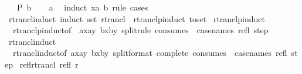 \begin{isabellebody}
\ \ \ {\isachardoublequoteopen}P\ b{\isachardoublequoteclose}\isanewline
%
\isadelimproof
\ \ %
\endisadelimproof
%
\isatagproof
{}\isamarkupfalse%
\ a\ \isamarkupfalse%
\ {\isacharparenleft}{\kern0pt}induct\ x{\isasymequiv}a\ b{\isacharparenright}{\kern0pt}\ {\isacharparenleft}{\kern0pt}rule\ cases{\isacharparenright}{\kern0pt}{\isacharplus}{\kern0pt}%
\endisatagproof
{\isafoldproof}%
%
\isadelimproof
\isanewline
%
\endisadelimproof
\isanewline
{}\isamarkupfalse%
\ rtrancl{\isacharunderscore}{\kern0pt}induct\ {\isacharbrackleft}{\kern0pt}induct\ set{\isacharcolon}{\kern0pt}\ rtrancl{\isacharbrackright}{\kern0pt}\ {\isacharequal}{\kern0pt}\ rtranclp{\isacharunderscore}{\kern0pt}induct\ {\isacharbrackleft}{\kern0pt}to{\isacharunderscore}{\kern0pt}set{\isacharbrackright}{\kern0pt}\isanewline
\isanewline
{}\isamarkupfalse%
\ rtranclp{\isacharunderscore}{\kern0pt}induct{}\ {\isacharequal}{\kern0pt}\isanewline
\ \ rtranclp{\isacharunderscore}{\kern0pt}induct{\isacharbrackleft}{\kern0pt}of\ {\isacharunderscore}{\kern0pt}\ {\isachardoublequoteopen}{\isacharparenleft}{\kern0pt}ax{\isacharcomma}{\kern0pt}ay{\isacharparenright}{\kern0pt}{\isachardoublequoteclose}\ {\isachardoublequoteopen}{\isacharparenleft}{\kern0pt}bx{\isacharcomma}{\kern0pt}by{\isacharparenright}{\kern0pt}{\isachardoublequoteclose}{\isacharcomma}{\kern0pt}\ split{\isacharunderscore}{\kern0pt}rule{\isacharcomma}{\kern0pt}\ consumes\ {}{\isacharcomma}{\kern0pt}\ case{\isacharunderscore}{\kern0pt}names\ refl\ step{\isacharbrackright}{\kern0pt}\isanewline
\isanewline
{}\isamarkupfalse%
\ rtrancl{\isacharunderscore}{\kern0pt}induct{}\ {\isacharequal}{\kern0pt}\isanewline
\ \ rtrancl{\isacharunderscore}{\kern0pt}induct{\isacharbrackleft}{\kern0pt}of\ {\isachardoublequoteopen}{\isacharparenleft}{\kern0pt}ax{\isacharcomma}{\kern0pt}ay{\isacharparenright}{\kern0pt}{\isachardoublequoteclose}\ {\isachardoublequoteopen}{\isacharparenleft}{\kern0pt}bx{\isacharcomma}{\kern0pt}by{\isacharparenright}{\kern0pt}{\isachardoublequoteclose}{\isacharcomma}{\kern0pt}\ split{\isacharunderscore}{\kern0pt}format\ {\isacharparenleft}{\kern0pt}complete{\isacharparenright}{\kern0pt}{\isacharcomma}{\kern0pt}\ consumes\ {}{\isacharcomma}{\kern0pt}\ case{\isacharunderscore}{\kern0pt}names\ refl\ step{\isacharbrackright}{\kern0pt}\isanewline
\isanewline
{}\isamarkupfalse%
\ refl{\isacharunderscore}{\kern0pt}rtrancl{\isacharcolon}{\kern0pt}\ {\isachardoublequoteopen}refl\ {\isacharparenleft}{\kern0pt}r\isactrlsup {\isacharasterisk}{\kern0pt}{\isacharparenright}{\kern0pt}{\isachardoublequoteclose}\isanewline

\end{isabellebody}
